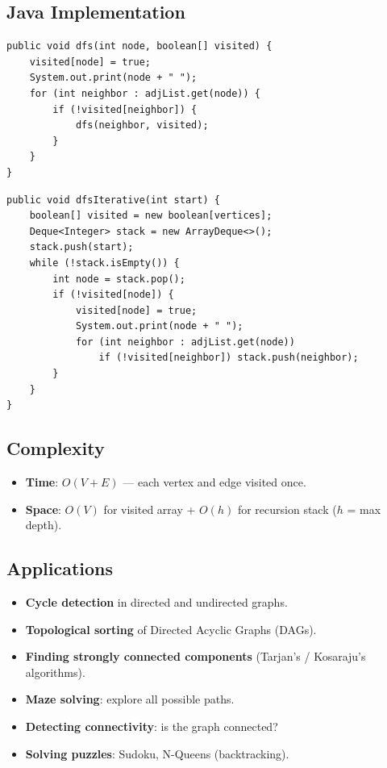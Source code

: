 \documentclass[12pt,a4paper]{article}
\begin{document}
\subsection{Java Implementation}
\begin{lstlisting}[style=javastyle, caption={DFS Recursive — Java}]
public void dfs(int node, boolean[] visited) {
    visited[node] = true;
    System.out.print(node + " ");
    for (int neighbor : adjList.get(node)) {
        if (!visited[neighbor]) {
            dfs(neighbor, visited);
        }
    }
}
\end{lstlisting}

\begin{lstlisting}[style=javastyle, caption={DFS Iterative (Stack) — Java}]
public void dfsIterative(int start) {
    boolean[] visited = new boolean[vertices];
    Deque<Integer> stack = new ArrayDeque<>();
    stack.push(start);
    while (!stack.isEmpty()) {
        int node = stack.pop();
        if (!visited[node]) {
            visited[node] = true;
            System.out.print(node + " ");
            for (int neighbor : adjList.get(node))
                if (!visited[neighbor]) stack.push(neighbor);
        }
    }
}
\end{lstlisting}

\subsection{Complexity}
\begin{itemize}
    \item \textbf{Time}: $O(V + E)$ — each vertex and edge visited once.
    \item \textbf{Space}: $O(V)$ for visited array + $O(h)$ for recursion stack ($h$ = max depth).
\end{itemize}

\subsection{Applications}
\begin{itemize}
    \item \textbf{Cycle detection} in directed and undirected graphs.
    \item \textbf{Topological sorting} of Directed Acyclic Graphs (DAGs).
    \item \textbf{Finding strongly connected components} (Tarjan's / Kosaraju's algorithms).
    \item \textbf{Maze solving}: explore all possible paths.
    \item \textbf{Detecting connectivity}: is the graph connected?
    \item \textbf{Solving puzzles}: Sudoku, N-Queens (backtracking).
\end{itemize}
\end{document}

